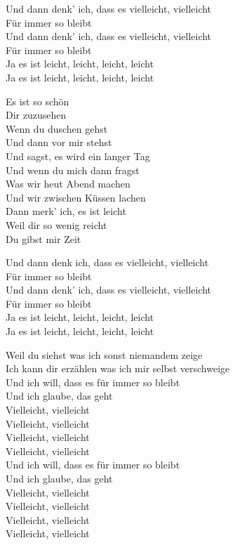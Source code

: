 \documentclass[]{book}
\begin{document}
Und dann denk' ich, dass es vielleicht, vielleicht\\
Für immer so bleibt\\
Und dann denk' ich, dass es vielleicht, vielleicht\\
Für immer so bleibt\\
Ja es ist leicht, leicht, leicht, leicht\\
Ja es ist leicht, leicht, leicht, leicht

Es ist so schön\\
Dir zuzusehen\\
Wenn du duschen gehst\\
Und dann vor mir stehst\\
Und sagst, es wird ein langer Tag\\
Und wenn du mich dann fragst\\
Was wir heut Abend machen\\
Und wir zwischen Küssen lachen\\
Dann merk' ich, es ist leicht\\
Weil dir so wenig reicht\\
Du gibst mir Zeit

Und dann denk ich, dass es vielleicht, vielleicht\\
Für immer so bleibt\\
Und dann denk' ich, dass es vielleicht, vielleicht\\
Für immer so bleibt\\
Ja es ist leicht, leicht, leicht, leicht\\
Ja es ist leicht, leicht, leicht, leicht

Weil du siehst was ich sonst niemandem zeige\\
Ich kann dir erzählen was ich mir selbst verschweige\\
Und ich will, dass es für immer so bleibt\\
Und ich glaube, das geht\\
Vielleicht, vielleicht\\
Vielleicht, vielleicht\\
Vielleicht, vielleicht\\
Vielleicht, vielleicht\\
Und ich will, dass es für immer so bleibt\\
Und ich glaube, das geht\\
Vielleicht, vielleicht\\
Vielleicht, vielleicht\\
Vielleicht, vielleicht\\
Vielleicht, vielleicht
\end{document}
